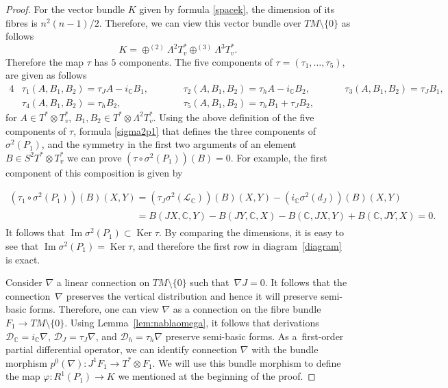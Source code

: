 \begin{proof}
For the vector bundle $K$ given by formula \eqref{spacek}, the
dimension of its f\/ibres is $n^2(n-1)/2$. Therefore, we can view this
vector bundle over $TM\setminus\{0\}$ as follows
\[
K=\oplus^{(2)}\Lambda^2T^*_v \oplus^{(3)}\Lambda^3T^*_v.
\]
Therefore the map $\tau$ has $5$ components.
The f\/ive components of $\tau=(\tau_1,\dots , \tau_5)$, are given as
follows
\begin{alignat*}{4}
& \tau_{1}(A,B_1,B_2) = \tau_JA - i_{\mathbb{C}}B_1, \qquad &&
\tau_{2}(A,B_1,B_2) = \tau_hA - i_{\mathbb{C}}B_2, \qquad &&
\tau_{3}(A,B_1,B_2) = \tau_JB_1,&  \\
& \tau_{4}(A,B_1,B_2) = \tau_hB_2, \qquad &&
\tau_{5}(A,B_1,B_2) = \tau_hB_1+\tau_JB_2, &&&
\end{alignat*}
for $A\in T^*\otimes T^*_v$, $B_1, B_2 \in T^*\otimes
\Lambda^2T^*_v$. Using the above def\/inition of the f\/ive components of $\tau$,
formula \eqref{sigma2p1} that def\/ines the three components of
$\sigma^2(P_1)$, and the symmetry in the f\/irst two arguments of an
element $B\in S^2T^*\otimes T^*_v$ we can prove $\left(\tau\circ
\sigma^2(P_1)\right)(B)=0$. For example, the f\/irst component of this
composition is given by {\sloppy
\begin{gather*}
\left(\tau_1\circ \sigma^2(P_1)\right)(B)(X,Y)  =
\left(\tau_J\sigma^2({\mathcal{L}_{\mathbb{C}}})\right)(B)(X,Y)-
\left(i_{\mathbb{C}}\sigma^2(d_J)\right)(B)(X,Y)\\
 \phantom{\left(\tau_1\circ \sigma^2(P_1)\right)(B)(X,Y)}{}
 = B(JX, \mathbb{C}, Y)- B(JY, \mathbb{C}, X) - B(\mathbb{C}, JX, Y)+ B(\mathbb{C}, JY, X)=0.\!
\end{gather*} It follows that $\operatorname{Im} \sigma^2(P_1)
\subset \operatorname{Ker} \tau $. By comparing the dimensions, it
is easy to see that  \mbox{$\operatorname{Im} \sigma^2(P_1) =
\operatorname{Ker} \tau $}, and therefore the f\/irst row in diagram~\eqref{diagram} is exact.

}

Consider $\nabla$ a linear connection on $TM\setminus\{0\}$ such
that~$\nabla J=0$. It follows that the connection~$\nabla$ preserves
the vertical distribution and hence it will preserve semi-basic
forms. Therefore, one can view $\nabla$ as a connection on the
f\/ibre bundle $F_1\to TM\setminus\{0\}$.  Using Lemma~\ref{lem:nablaomega}, it follows that derivations
$\mathcal{D}_{\mathbb{C}}=i_{\mathbb{C}}\nabla$,
$\mathcal{D}_{J}=\tau_{J}\nabla$, and $\mathcal{D}_{h}=\tau_{h}\nabla$
preserve semi-basic forms. As a~f\/irst-order partial
dif\/ferential operator, we can identify connection $\nabla$ with
the bundle morphism $p^0(\nabla): J^1F_1 \to T^*\otimes F_1$.
We will use this bundle morphism to def\/ine the map $\varphi: R^1(P_1)
\to K$ we mentioned at the beginning of the proof.


\end{proof}
